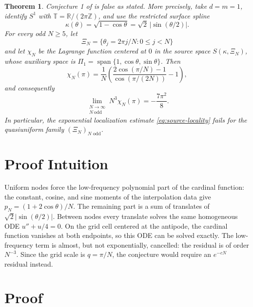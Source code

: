 \documentclass[11pt]{article}
\newtheorem{theorem}{Theorem}
\newcommand{\T}{\mathbb T}
\newcommand{\PiOne}{\Pi_1}
\begin{document}
\begin{theorem}\label{thm:main}
Conjecture 1 of \cite{HNSW} is false as stated. More precisely, take
\(d=m=1\), identify \(S^1\) with \(\T=\mathbb R/(2\pi\mathbb Z)\), and use
the restricted surface spline
\[
 \kappa(\theta)=\sqrt{1-\cos\theta}=\sqrt2\,|\sin(\theta/2)|.
\]
For every odd \(N\ge5\), let
\[
 \Xi_N=\{\theta_j=2\pi j/N:0\le j<N\}
\]
and let \(\chi_N\) be the Lagrange function centered at \(0\) in the source
space \(S(\kappa,\Xi_N)\), whose auxiliary space is
\(\PiOne=\operatorname{span}\{1,\cos\theta,\sin\theta\}\). Then
\begin{equation}\label{eq:exact}
 \chi_N(\pi)=\frac1N\left(
 \frac{2\cos(\pi/N)-1}{\cos(\pi/(2N))}-1\right),
\end{equation}
and consequently
\begin{equation}\label{eq:asymptotic}
 \lim_{\substack{N\to\infty\\N\ \mathrm{odd}}}N^3\chi_N(\pi)
 =-\frac{7\pi^2}{8}.
\end{equation}
In particular, the exponential localization estimate
\eqref{eq:source-locality} fails for the quasiuniform family
\((\Xi_N)_{N\text{ odd}}\).
\end{theorem}

\section*{Proof Intuition}

Uniform nodes force the low-frequency polynomial part of the cardinal
function: the constant, cosine, and sine moments of the interpolation data
give \(p_N=(1+2\cos\theta)/N\). The remaining part is a sum of translates of
\(\sqrt2|\sin(\theta/2)|\). Between nodes every translate solves the same
homogeneous ODE \(u''+u/4=0\). On the grid cell centered at the antipode, the
cardinal function vanishes at both endpoints, so this ODE can be solved
exactly. The low-frequency term is almost, but not exponentially, cancelled:
the residual is of order \(N^{-3}\). Since the grid scale is \(q=\pi/N\),
the conjecture would require an \(e^{-cN}\) residual instead.

\section*{Proof}
\end{document}
